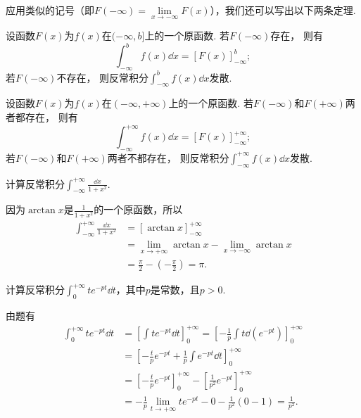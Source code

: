 应用类似的记号（即\(F(-\infty) = \lim\limits_{x\to-\infty} F(x)\)），我们还可以写出以下两条定理.
\begin{theorem}\label{theorem:定积分.利用牛顿莱布尼茨公式计算无穷限的反常积分2}
设函数\(F(x)\)为\(f(x)\)在\((-\infty,b]\)上的一个原函数.
若\(F(-\infty)\)存在，%
则有
\begin{equation}\label{equation:定积分.利用牛顿莱布尼茨公式计算无穷限的反常积分2}
\int_{-\infty}^b f(x) \dd{x} = [F(x)]_{-\infty}^b;
\end{equation}
若\(F(-\infty)\)不存在，%
则反常积分\(\int_{-\infty}^b f(x) \dd{x}\)发散.
\end{theorem}

\begin{theorem}\label{theorem:定积分.利用牛顿莱布尼茨公式计算无穷限的反常积分3}
设函数\(F(x)\)为\(f(x)\)在\((-\infty,+\infty)\)上的一个原函数.
若\(F(-\infty)\)和\(F(+\infty)\)两者都存在，%
则有
\begin{equation}\label{equation:定积分.利用牛顿莱布尼茨公式计算无穷限的反常积分3}
\int_{-\infty}^{+\infty} f(x) \dd{x} = [F(x)]_{-\infty}^{+\infty};
\end{equation}
若\(F(-\infty)\)和\(F(+\infty)\)两者不都存在，%
则反常积分\(\int_{-\infty}^{+\infty} f(x) \dd{x}\)发散.
\end{theorem}

\begin{example}
计算反常积分\(\int_{-\infty}^{+\infty} \frac{\dd{x}}{1+x^2}\).
\begin{solution}
因为\(\arctan x\)是\(\frac{1}{1+x^2}\)的一个原函数，所以\[
\begin{split}
\int_{-\infty}^{+\infty} \frac{\dd{x}}{1+x^2}
&= [\arctan x]_{-\infty}^{+\infty} \\
&= \lim\limits_{x\to+\infty} \arctan x
	-\lim\limits_{x\to-\infty} \arctan x \\
&= \frac{\pi}{2} - \left(-\frac{\pi}{2}\right) = \pi.
\end{split}
\]
\end{solution}
\end{example}

\begin{example}
计算反常积分\(\int_0^{+\infty} t e^{-pt} \dd{t}\)，其中\(p\)是常数，且\(p>0\).
\begin{solution}
由题有\begin{align*}
\int_0^{+\infty} t e^{-pt} \dd{t}
&= \left[ \int t e^{-pt} \dd{t} \right]_0^{+\infty}
= \left[ -\frac{1}{p} \int t \dd(e^{-pt}) \right]_0^{+\infty} \\
&= \left[ -\frac{t}{p} e^{-pt} + \frac{1}{p} \int e^{-pt} \dd{t} \right]_0^{+\infty} \\
&= \left[ -\frac{t}{p} e^{-pt} \right]_0^{+\infty} - \left[ \frac{1}{p^2} e^{-pt} \right]_0^{+\infty} \\
&= -\frac{1}{p} \lim\limits_{t\to+\infty} t e^{-pt} - 0 - \frac{1}{p^2}(0-1) = \frac{1}{p^2}.
\end{align*}
\end{solution}
\end{example}

